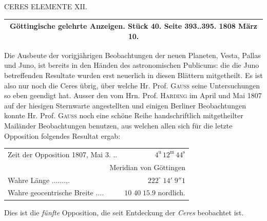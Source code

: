 \clearpage
{}
\hypertarget{native-304-lower}{}
\begin{center}CERES ELEMENTE XII.
\end{center}

\begin{center}
\fontsize{10}{12}\selectfont\begin{tabular}{c}
\hline
Göttingische gelehrte Anzeigen. Stück 40. Seite 393..395. 1808 März 10. \\
\hline
\end{tabular}
\end{center}

Die Ausbeute der vorigjährigen Beobachtungen der neuen Planeten, Vesta, Pallas und Juno, ist
bereits in den Händen des astronomischen Publicums: die die Juno betreffenden Resultate wurden
erst neuerlich in diesen Blättern mitgetheilt. Es ist also nur noch die Ceres übrig, über welche
Hr. Prof. \textsc{Gauss} seine Untersuchungen so eben geendigt hat. Ausser den vom Hrn. Prof.
\textsc{Harding} im April und Mai 1807 auf der hiesigen Sternwarte angestellten und einigen
Berliner Beobachtungen konnte Hr. Prof. \textsc{Gauss} noch eine schöne Reihe handschriftlich
mitgetheilter Mailänder Beobachtungen benutzen, aus welchen allen sich für die letzte Opposition
folgendes Resultat ergab:


\begin{center}\fontsize{10}{12}\selectfont\setlength{\tabcolsep}{3pt}\renewcommand{\arraystretch}{1.15}\begin{tabular}{lr}
Zeit der Opposition 1807, Mai 3. .\;.\; & $4^{\text{u}}\,12^{\text{m}}\,44^{\text{s}}$\\
\multicolumn{2}{r}{Meridian von Göttingen}\\
Wahre Länge .\;.\;.\;.\;.\;.\;.\;,\;.\; & $222^\circ\;14'\;9''1$\\
Wahre geocentrische Breite .\;.\;.\;.\; & $10\;40\;15.9$ nordlich.\\
\end{tabular}\end{center}

\noindent Dies ist die \emph{fünfte} Opposition, die seit Entdeckung der \emph{Ceres} beobachtet ist.

